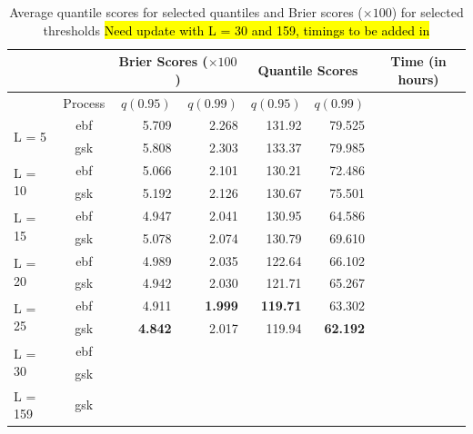 \documentclass[11pt]{article}
\begin{document}
\begin{table}[htbp]
\caption{Average quantile scores for selected quantiles and Brier scores ($\times 100$) for selected thresholds \hl{Need update with L = 30 and 159, timings to be added in}}
\centering
\small
  \begin{tabular}{lc|rr|rr|c}
   \multicolumn{2}{c}{  }& \multicolumn{2}{|c|}{Brier Scores ($\times 100$)} & \multicolumn{2}{|c|}{Quantile Scores} & Time (in hours)\\
   \hline
   & Process & $q(0.95)$ & $q(0.99)$ & $q(0.95)$ & $q(0.99)$\\
   \hline
  \multirow{2}{*}{L = 5}  & ebf & 5.709 & 2.268 & 131.92 & 79.525 & \\
                          & gsk & 5.808 & 2.303 & 133.37 & 79.985 & \\
   \hline
  \multirow{2}{*}{L = 10} & ebf & 5.066 & 2.101 & 130.21 & 72.486 & \\
                          & gsk & 5.192 & 2.126 & 130.67 & 75.501 & \\
   \hline
  \multirow{2}{*}{L = 15} & ebf & 4.947 & 2.041 & 130.95 & 64.586 & \\
                          & gsk & 5.078 & 2.074 & 130.79 & 69.610 & \\
   \hline
  \multirow{2}{*}{L = 20} & ebf & 4.989 & 2.035 & 122.64 & 66.102 & \\
                          & gsk & 4.942 & 2.030 & 121.71 & 65.267 & \\
   \hline
  \multirow{2}{*}{L = 25} & ebf & 4.911 & \textbf{1.999} & \textbf{119.71} & 63.302 & \\
                          & gsk & \textbf{4.842} & 2.017 & 119.94 & \textbf{62.192} & \\
   \hline
  \multirow{2}{*}{L = 30} & ebf &  &  &  &  & \\
                          & gsk &  &  &  &  & \\
  \hline
  L = 159                 & gsk &  &  &  &  & \\
  \hline
	\end{tabular}
\end{table}

\end{document}
